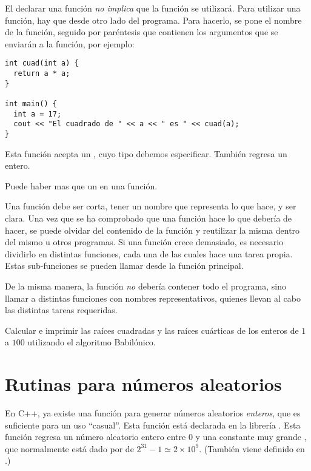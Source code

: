 El declarar una función \emph{no implica} que la función se utilizará. 
Para utilizar una función, hay que  desde otro lado del programa.
Para hacerlo, se pone el nombre de la función, seguido por paréntesis que
contienen los argumentos que se enviarán a la función, por ejemplo:
\begin{lstlisting}
int cuad(int a) {
  return a * a;
}

int main() {
  int a = 17;
  cout << "El cuadrado de " << a << " es " << cuad(a);
}
\end{lstlisting}
Esta función acepta un  , cuyo tipo debemos especificar.
También regresa un entero.

Puede haber mas que un  en una función.

Una función debe ser corta,
tener un nombre que representa lo que hace, y ser clara.
Una vez que se ha comprobado que una función hace lo que debería de
hacer, se puede olvidar del contenido de la función y reutilizar la misma
dentro del mismo u otros programas.  Si una función crece demasiado, 
es necesario dividirlo en distintas funciones, cada una de las
cuales hace una tarea propia.  Estas sub-funciones se pueden llamar desde la
función principal.

De la misma manera, la función  \emph{no} debería contener todo el
programa, sino llamar a distintas funciones con nombres representativos,
quienes llevan al cabo las distintas tareas requeridas.

\ejercicio 
Calcular e imprimir las raíces cuadradas y las raíces cuárticas de los enteros
de $1$ a $100$ utilizando el algoritmo Babilónico.


\section{Rutinas para números aleatorios}

En C++, ya existe una función  para generar números aleatorios
\emph{enteros}, que es suficiente para un uso ``casual''.
Esta función está declarada en la librería .
Esta función
regresa un número aleatorio entero entre $0$ y una constante muy 
grande ,  que normalmente está dado por de $2^{31} - 1 \simeq 2
\times 10^9$.
(También viene definido en .)

